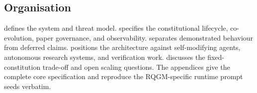 \subsection{Organisation}\label{sec:intro:organisation}

 defines the system and threat model.
 specifies the constitutional lifecycle, co-evolution,
paper governance, and observability.  separates
demonstrated behaviour from deferred claims.  positions
the architecture against self-modifying agents, autonomous research
systems, and verification work.  discusses the
fixed-constitution trade-off and open scaling questions. The appendices
give the complete core specification and reproduce the RQGM-specific
runtime prompt seeds verbatim.
